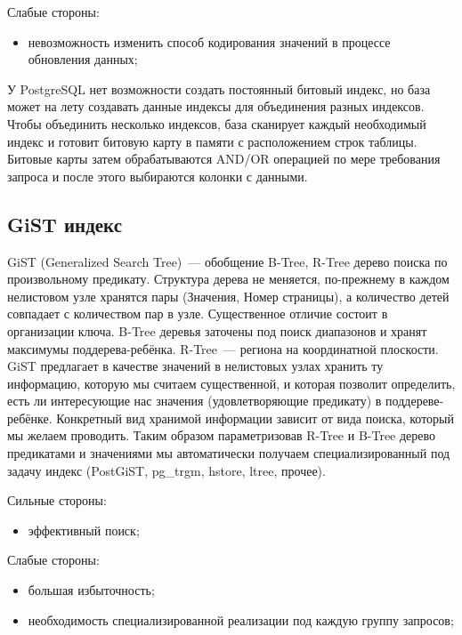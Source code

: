 Слабые стороны:

\begin{itemize}
  \item невозможность изменить способ кодирования значений в процессе обновления данных;
\end{itemize}

У PostgreSQL нет возможности создать постоянный битовый индекс, но база может на лету создавать данные индексы для объединения разных индексов. Чтобы объединить несколько индексов, база сканирует каждый необходимый индекс и готовит битовую карту в памяти с расположением строк таблицы. Битовые карты затем обрабатываются AND/OR операцией по мере требования запроса и после этого выбираются колонки с данными.



\subsection{GiST индекс}

GiST (Generalized Search Tree)~--- обобщение B-Tree, R-Tree дерево поиска по произвольному предикату. Структура дерева не меняется, по-прежнему в каждом нелистовом узле хранятся пары (Значения, Номер страницы), а количество детей совпадает с количеством пар в узле. Существенное отличие состоит в организации ключа. B-Tree деревья заточены под поиск диапазонов и хранят максимумы поддерева-ребёнка. R-Tree~--- региона на координатной плоскости. GiST предлагает в качестве значений в нелистовых узлах хранить ту информацию, которую мы считаем существенной, и которая позволит определить, есть ли интересующие нас значения (удовлетворяющие предикату) в поддереве-ребёнке. Конкретный вид хранимой информации зависит от вида поиска, который мы желаем проводить. Таким образом параметризовав R-Tree и B-Tree дерево предикатами и значениями мы автоматически получаем специализированный под задачу индекс (PostGiST, pg\_trgm, hstore, ltree, прочее).

Сильные стороны:

\begin{itemize}
  \item эффективный поиск;
\end{itemize}

Слабые стороны:

\begin{itemize}
  \item большая избыточность;
  \item необходимость специализированной реализации под каждую группу запросов;
\end{itemize}

